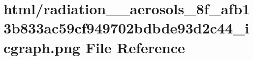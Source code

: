 \hypertarget{radiation____aerosols__8f__afb13b833ac59cf949702bdbde93d2c44__icgraph_8png}{}\section{html/radiation\+\_\+\+\_\+aerosols\+\_\+8f\+\_\+afb13b833ac59cf949702bdbde93d2c44\+\_\+icgraph.png File Reference}
\label{radiation____aerosols__8f__afb13b833ac59cf949702bdbde93d2c44__icgraph_8png}
